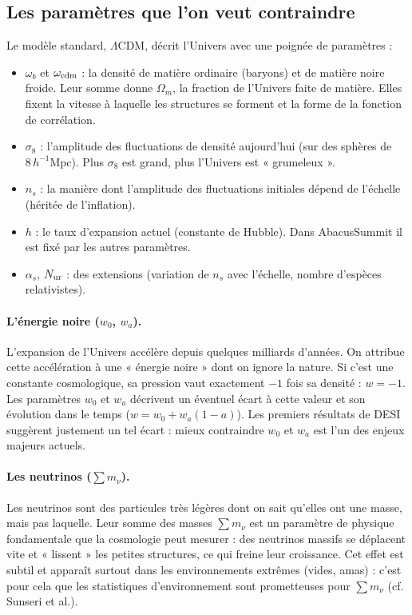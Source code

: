 \documentclass[11pt]{article}
\newcommand{\Mpch}{\,h^{-1}\mathrm{Mpc}}
\begin{document}
\subsection{Les paramètres que l'on veut contraindre}
Le modèle standard, $\Lambda$CDM, décrit l'Univers avec une poignée de paramètres :
\begin{itemize}
\item $\omega_b$ et $\omega_{\rm cdm}$ : la densité de matière ordinaire (baryons) et de matière noire froide. Leur somme donne $\Omega_m$, la fraction de l'Univers faite de matière. Elles fixent la vitesse à laquelle les structures se forment et la forme de la fonction de corrélation.
\item $\sigma_8$ : l'amplitude des fluctuations de densité aujourd'hui (sur des sphères de $8\Mpch$). Plus $\sigma_8$ est grand, plus l'Univers est « grumeleux ».
\item $n_s$ : la manière dont l'amplitude des fluctuations initiales dépend de l'échelle (héritée de l'inflation).
\item $h$ : le taux d'expansion actuel (constante de Hubble). Dans AbacusSummit il est fixé par les autres paramètres.
\item $\alpha_s$, $N_{\rm ur}$ : des extensions (variation de $n_s$ avec l'échelle, nombre d'espèces relativistes).
\end{itemize}

\paragraph{L'énergie noire ($w_0$, $w_a$).} L'expansion de l'Univers accélère depuis quelques milliards d'années. On attribue cette accélération à une « énergie noire » dont on ignore la nature. Si c'est une constante cosmologique, sa pression vaut exactement $-1$ fois sa densité : $w=-1$. Les paramètres $w_0$ et $w_a$ décrivent un éventuel écart à cette valeur et son évolution dans le temps ($w = w_0 + w_a(1-a)$). Les premiers résultats de DESI suggèrent justement un tel écart : mieux contraindre $w_0$ et $w_a$ est l'un des enjeux majeurs actuels.

\paragraph{Les neutrinos ($\sum m_\nu$).} Les neutrinos sont des particules très légères dont on sait qu'elles ont une masse, mais pas laquelle. Leur somme des masses $\sum m_\nu$ est un paramètre de physique fondamentale que la cosmologie peut mesurer : des neutrinos massifs se déplacent vite et « lissent » les petites structures, ce qui freine leur croissance. Cet effet est subtil et apparaît surtout dans les environnements extrêmes (vides, amas) : c'est pour cela que les statistiques d'environnement sont prometteuses pour $\sum m_\nu$ (cf. Sunseri et al.).
\end{document}

